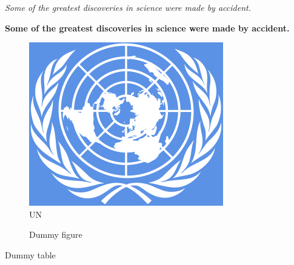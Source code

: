 \documentclass[10pt,a4paper]{article}
\begin{document}
\textit{Some of the greatest discoveries in science  were made by accident.}

\textbf{Some of the greatest discoveries in science were made by accident.}
\begin{figure}[hbtp]
\caption{UN}
\centering
\includegraphics[scale=1]{800px-Flag_of_the_United_Nations.svg.png}
\end{figure}
\begin{figure}
  \caption{Dummy figure}
\end{figure}
\begin{table}
  \caption{Dummy table}
\end{table}
\newpage
\begin{appendix}
  \listoffigures
  \listoftables
\end{appendix}
\end{document}
